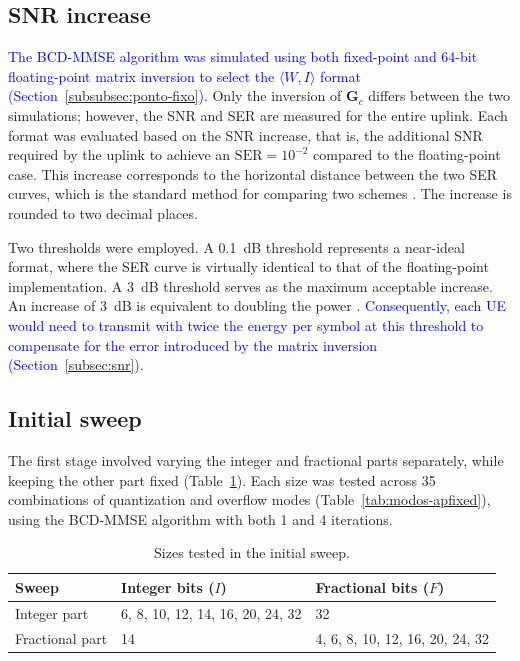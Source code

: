 
\subsection{\texorpdfstring{SNR increase}{SNR increase}}\label{subsec:aumento-snr}

\textcolor{blue}{The BCD-MMSE algorithm was simulated using both fixed-point and 64-bit floating-point matrix inversion to select the $\langle W, I\rangle$ format (Section~\ref{subsubsec:ponto-fixo}).} Only the inversion of $\mathbf G_c$ differs between the two simulations; however, the SNR and SER are measured for the entire uplink. Each format was evaluated based on the SNR increase, that is, the additional SNR required by the uplink to achieve an $\mathrm{SER} = 10^{-2}$ compared to the floating-point case. This increase corresponds to the horizontal distance between the two SER curves, which is the standard method for comparing two schemes \cite[p.~55]{tse-viswanath}. The increase is rounded to two decimal places.

Two thresholds were employed. A 0.1~dB threshold represents a near-ideal format, where the SER curve is virtually identical to that of the floating-point implementation. A 3~dB threshold serves as the maximum acceptable increase. An increase of 3~dB is equivalent to doubling the power \cite[p.~73]{tse-viswanath}. \textcolor{blue}{Consequently, each UE would need to transmit with twice the energy per symbol at this threshold to compensate for the error introduced by the matrix inversion (Section~\ref{subsec:snr}).}



\subsection{\texorpdfstring{Initial sweep}{Initial sweep}}
The first stage involved varying the integer and fractional parts separately, while keeping the other part fixed (Table~\ref{tab:varredura-inicial}). Each size was tested across 35 combinations of quantization and overflow modes (Table~\ref{tab:modos-apfixed}), using the BCD-MMSE algorithm with both 1 and 4 iterations.

\begin{table}[htbp]
\caption{Sizes tested in the initial sweep.}
\label{tab:varredura-inicial}
\vspace{4pt} %
\centering
\footnotesize
\renewcommand{\arraystretch}{1.2}
\begin{tabular}{lll}
\toprule
\textbf{Sweep} & \textbf{Integer bits} ({\boldmath $I$}) & \textbf{Fractional bits} ({\boldmath $F$}) \\
\midrule
Integer part & 6, 8, 10, 12, 14, 16, 20, 24, 32 & 32 \\
Fractional part & 14 & 4, 6, 8, 10, 12, 16, 20, 24, 32 \\
\bottomrule
\end{tabular}
\vspace{4pt}
\end{table}

